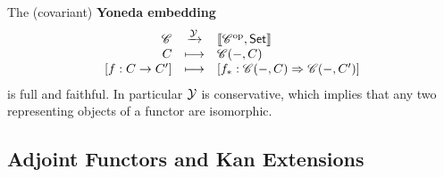 	\begin{corollary}
		The (covariant) \textbf{Yoneda embedding}
		\begin{align*}
			\begin{array}{rcl}
				\mathscr{C} & \xrightarrow{\mathcal{Y}} & |[\mathscr{C}^{\text{op}},\textsf{Set}|]\\
				C & \longmapsto & \mathscr{C}(-,C)\\
				{[f:C\rightarrow C']} & \longmapsto & {[f_{*}:\mathscr{C}(-,C)\Rightarrow\mathscr{C}(-,C')]}
			\end{array}
		\end{align*}
		is full and faithful. In particular $\mathcal{Y}$ is conservative, which implies that any two representing objects of a functor are isomorphic.
	\end{corollary}

	\newpage
	\subsection{Adjoint Functors and Kan Extensions}

